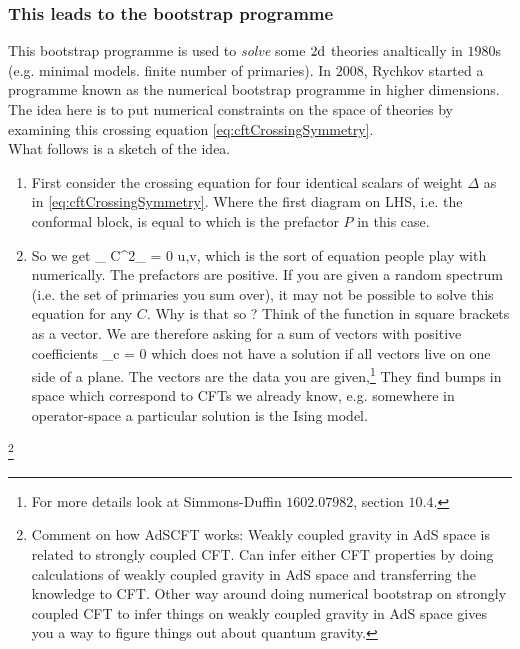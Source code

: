  \subsubsection{This leads to the bootstrap programme}
 	This bootstrap programme is used to \emph{solve} some $2\mathrm{d}$ theories analtically in $1980$s (e.g. minimal models. finite number of primaries).
 	In $2008$, Rychkov started a programme known as the numerical bootstrap programme in higher dimensions. The idea here is to put numerical constraints on the space of theories by examining this crossing equation \ref{eq:cftCrossingSymmetry}.\\
 	What follows is a sketch of the idea.
 	\begin{enumerate}
 		\item First consider the crossing equation for four identical scalars of weight $\Delta$ as in \ref{eq:cftCrossingSymmetry}. Where the first diagram on LHS, i.e. the conformal block, is equal to\bse 
 		\ese 
 		which is the prefactor $P$ in this case. 
 		\item So we get 
 		\be
 		\sum_{\mO} C^2_{\phi \phi \mO}  = 0 \qquad \forall u,v,
 		\ee 
 		which is the sort of equation people play with numerically. The prefactors are positive. If you are given a random spectrum (i.e. the set of primaries you sum over), it may not be possible to solve this equation for any $C$. Why is that so ? Think of the function in square brackets as a vector. We are therefore asking for a sum of vectors with positive coefficients
 		\bse 
 		\sum {}_{c}  = 0
 		\ese 
 		which does not have a solution if all vectors live on one side of a plane. The vectors are the data you are given,\footnote{For more details look at Simmons-Duffin $1602.07982$, section $10.4$.} They find bumps in space which correspond to CFTs we already know, e.g. somewhere in operator-space a particular solution is the Ising model.
 	\end{enumerate}
 	
 	
\footnote{Comment on how AdSCFT works: Weakly coupled gravity in AdS space is related to strongly coupled CFT. Can infer either CFT properties by doing calculations of weakly coupled gravity in AdS space and transferring the knowledge to CFT. Other way around doing numerical bootstrap on strongly coupled CFT to infer things on weakly coupled gravity in AdS space gives you a way to figure things out about quantum gravity.}
 	
